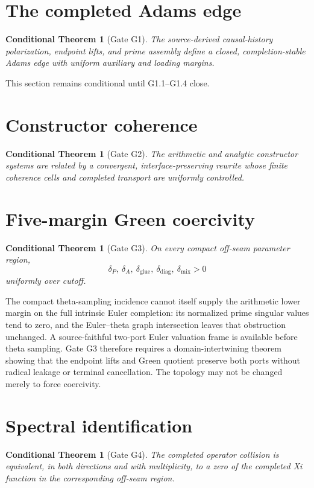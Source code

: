 \documentclass[11pt]{article}
\newtheorem{conditionaltheorem}[theorem]{Conditional Theorem}
\begin{document}
\section{The completed Adams edge}
\begin{conditionaltheorem}[Gate G1]
The source-derived causal-history polarization, endpoint lifts, and prime assembly define a closed, completion-stable Adams edge with uniform auxiliary and loading margins.
\end{conditionaltheorem}
This section remains conditional until G1.1--G1.4 close.

\section{Constructor coherence}
\begin{conditionaltheorem}[Gate G2]
The arithmetic and analytic constructor systems are related by a convergent, interface-preserving rewrite whose finite coherence cells and completed transport are uniformly controlled.
\end{conditionaltheorem}

\section{Five-margin Green coercivity}
\begin{conditionaltheorem}[Gate G3]
On every compact off-seam parameter region,
\[
\delta_P,\ \delta_A,\ \delta_{\mathrm{glue}},\
\delta_{\mathrm{diag}},\ \delta_{\mathrm{mix}}>0
\]
uniformly over cutoff.
\end{conditionaltheorem}
The compact theta-sampling incidence cannot itself supply the arithmetic lower margin on the full intrinsic Euler completion: its normalized prime singular values tend to zero, and the Euler--theta graph intersection leaves that obstruction unchanged. A source-faithful two-port Euler valuation frame is available before theta sampling. Gate G3 therefore requires a domain-intertwining theorem showing that the endpoint lifts and Green quotient preserve both ports without radical leakage or terminal cancellation. The topology may not be changed merely to force coercivity.

\section{Spectral identification}
\begin{conditionaltheorem}[Gate G4]
The completed operator collision is equivalent, in both directions and with multiplicity, to a zero of the completed Xi function in the corresponding off-seam region.
\end{conditionaltheorem}
\end{document}

